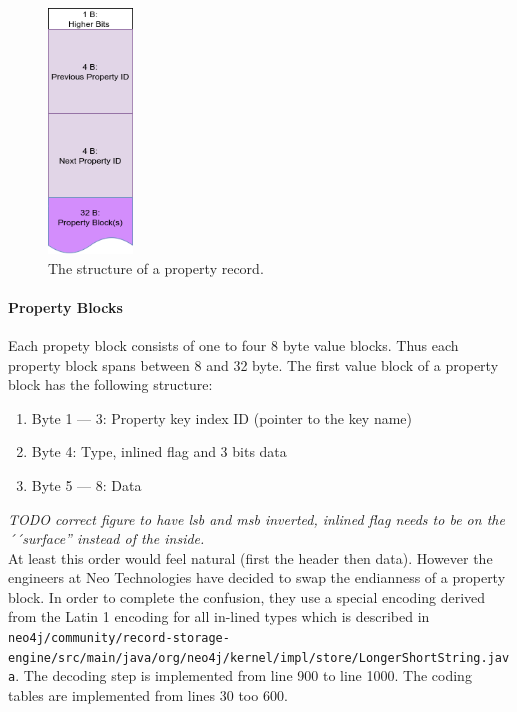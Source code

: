 \documentclass[a4paper,10pt]{article}
\begin{document}
            \begin{figure}[htp]\label{prop}
                \begin{center}
                    \includegraphics[keepaspectratio,height=0.2\textheight,width=0.2\textwidth]{img/03_record/property/property.png}
                \end{center}
                \caption{The structure of a property record.}
            \end{figure}
            
          \paragraph{Property Blocks} 
            Each propety block consists of one to four 8 byte value blocks.
            Thus each property block spans between 8 and 32 byte.
            The first value block of a property block has the following structure:
            \begin{enumerate}
                \item Byte 1 --- 3: Property key index ID (pointer to the key name)
                \item Byte 4: Type, inlined flag and 3 bits data
                \item Byte 5 --- 8: Data
            \end{enumerate}
            \textit{TODO correct figure to have lsb and msb inverted, inlined flag needs to be on the ´´surface'' instead of the inside.} \\
            
            At least this order would feel natural (first the header then data).
            However the engineers at Neo Technologies have decided to swap the endianness of a property block.
            In order to complete the confusion, they use a special encoding derived from the Latin 1 encoding for all in-lined types which is described in \texttt{neo4j/community/record-storage-engine/src/main/java/org/neo4j/kernel/impl/store/LongerShortString.java}.
            The decoding step is implemented from line 900 to line 1000.
            The coding tables are implemented from lines 30 too 600.
            
\end{document}
